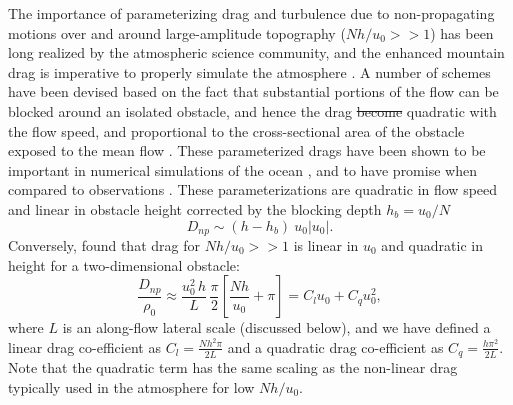 \documentclass[twocol]{ametsocV5}
\providecommand{\DIFadd}[1]{{\protect\color{blue}\uwave{#1}}} %
\providecommand{\DIFdel}[1]{{\protect\color{red}\sout{#1}}}                      %
\providecommand{\DIFaddbegin}{} %
\providecommand{\DIFaddend}{} %
\providecommand{\DIFdelbegin}{} %
\providecommand{\DIFdelend}{} %
\begin{document}
The importance of parameterizing drag and turbulence due to non-propagating motions over and around large-amplitude topography ($Nh/u_0 >> 1$) has been long realized by the atmospheric science community, and the enhanced mountain drag is imperative to properly simulate the atmosphere \citep[i.e.][]{bacmeisterpierrhumbert88,LottMiller97}.  A number of schemes have been devised based on the fact that substantial portions of the flow can be blocked around an isolated obstacle, and hence the drag \DIFdelbegin \DIFdel{become }\DIFdelend \DIFaddbegin \DIFadd{becomes }\DIFaddend quadratic with the flow speed, and proportional to the cross-sectional area of the obstacle exposed to the mean flow \citep[i.e.][]{ScinoccaMcFarlane00, Garner05}.  These parameterized drags have been shown to be important in numerical simulations of the ocean \citep{trossmanetal13,trossmanetal2016}, and to have promise when compared to observations \citep{TrossmanEtAl15}.  These parameterizations are quadratic in flow speed and linear in obstacle height corrected by the blocking depth $h_b = u_0/N$\DIFaddbegin \DIFadd{, i.e.
}\DIFaddend \begin{equation}
    D_{np} \sim (h-h_b)\ u_0 \left|u_0\right|.
\end{equation}
Conversely, \citep{klymaketal10a} found that drag for $Nh/u_0 >> 1$ is linear in $u_0$ and quadratic in height for a two-dimensional obstacle:
\begin{equation}
    \frac{D_{np}}{\rho_0} \approx \frac{u_0^2\, h}{L}\, \frac{\pi}{2}\left[\frac{N h}{u_0}+ \pi\right] = C_l u_0 + C_q u_0^2,
    \label{eq:FormDragParam}
\end{equation}
where $L$ is an along-flow lateral scale (discussed below), and we have defined a linear drag co-efficient as $C_l = \frac{N h^2\pi}{2L}$ and a quadratic drag co-efficient as $C_q = \frac{h\pi^2}{2L}$.  Note that the quadratic  term has the same scaling as the non-linear drag typically used in the atmosphere for low $Nh/u_0$.
\end{document}
